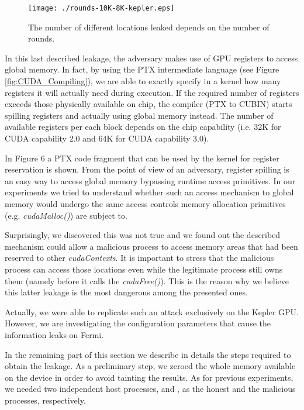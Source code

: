 \documentclass[11pt,onecolumn,letterpaper]{IEEEtran}
\begin{document}
\begin{figure}
	\centering
	\texttt{[image: ./rounds-10K-8K-kepler.eps]}
	\caption{The number of different locations leaked depends on the number of rounds.}
	\label{fig:reg-rounds-kepler}
\end{figure}

In this last described leakage, the adversary makes use of GPU registers to access global memory.
In fact, by using the PTX intermediate language (see Figure \ref{fig:CUDA_Compiling}), 
we are able to exactly specify in a kernel how many registers it will actually need during execution.
If the required number of registers exceeds those physically available on chip,
the compiler (PTX to CUBIN) starts spilling registers and actually using global memory instead.
The number of available registers per each block depends on the chip capability
(i.e. 32K for CUDA capability 2.0 and 64K for CUDA capability 3.0). 

In Figure 6
a PTX code fragment that can be used by the kernel for register reservation is shown.
From the point of view of an adversary, register spilling is an easy way to access global memory bypassing runtime access primitives.
In our experiments we tried to understand whether such an access mechanism to global memory
would undergo the same access controls memory allocation primitives (e.g. \emph{cudaMalloc()}) are subject to.

Surprisingly, we discovered this was not true and we found out the described mechanism could allow a malicious process to access
memory areas that had been reserved to other \emph{cudaContexts}.
It is important to stress that the malicious process can access those locations
even while the legitimate process still owns them (namely before it calls the \emph{cudaFree()}).
This is the reason why we believe this latter leakage is the most dangerous among the presented ones.

Actually, we were able to replicate such an attack exclusively on the Kepler GPU.
However, we are investigating the configuration parameters that cause the information leaks on Fermi. 

In the remaining part of this section we describe in details the steps required to obtain the leakage. 
As a preliminary step, we zeroed the whole memory available on the device in order to avoid tainting the results. 
As for previous experiments, we needed two independent host processes,  and , as the honest and the malicious processes, respectively.
\end{document}
